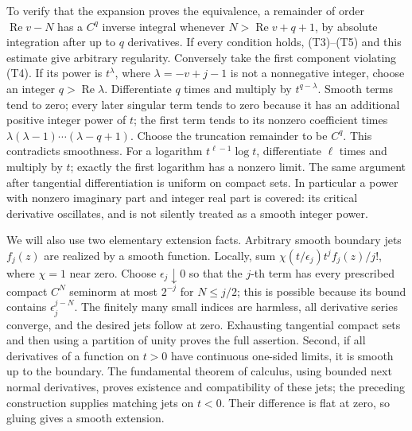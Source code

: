 \documentclass[
  11pt,
]{article}
\makeatletter
\let\ReaderOriginalAnchorStart\hyper@anchorstart
\let\ReaderOriginalAnchorEnd\hyper@anchorend
\let\ReaderPendingAliases\@empty
\def\ReaderArmAliases#1{\gdef\ReaderPendingAliases{#1}}
\def\hyper@anchorstart#1{\ReaderIfNativeAnchorTF{#1}{\ReaderPendingAliases\global\let\ReaderPendingAliases\@empty}{}\ReaderOriginalAnchorStart{#1}}
\makeatother
\begin{document}
To verify that the expansion proves the equivalence, a remainder of
order \(\operatorname{Re}v-N\) has a \(C^q\) inverse integral whenever
\(N>\operatorname{Re}v+q+1\), by absolute integration after up to \(q\)
derivatives. If every condition holds, (T3)--(T5) and this estimate give
arbitrary regularity. Conversely take the first component violating
(T4). If its power is \(t^\lambda\), where \(\lambda=-v+j-1\) is not a
nonnegative integer, choose an integer \(q>\operatorname{Re}\lambda\).
Differentiate \(q\) times and multiply by \(t^{q-\lambda}\). Smooth
terms tend to zero; every later singular term tends to zero because it
has an additional positive integer power of \(t\); the first term tends
to its nonzero coefficient times
\(\lambda(\lambda-1)\cdots(\lambda-q+1)\). Choose the truncation
remainder to be \(C^q\). This contradicts smoothness. For a logarithm
\(t^{\ell-1}\log t\), differentiate \(\ell\) times and multiply by
\(t\); exactly the first logarithm has a nonzero limit. The same
argument after tangential differentiation is uniform on compact sets. In
particular a power with nonzero imaginary part and integer real part is
covered: its critical derivative oscillates, and is not silently treated
as a smooth integer power.

We will also use two elementary extension facts. Arbitrary smooth
boundary jets \(f_j(z)\) are realized by a smooth function. Locally, sum
\(\chi(t/\epsilon_j)t^j f_j(z)/j!\), where \(\chi=1\) near zero. Choose
\(\epsilon_j\downarrow0\) so that the \(j\)-th term has every prescribed
compact \(C^N\) seminorm at most \(2^{-j}\) for \(N\leq j/2\); this is
possible because its bound contains \(\epsilon_j^{j-N}\). The finitely
many small indices are harmless, all derivative series converge, and the
desired jets follow at zero. Exhausting tangential compact sets and then
using a partition of unity proves the full assertion. Second, if all
derivatives of a function on \(t>0\) have continuous one-sided limits,
it is smooth up to the boundary. The fundamental theorem of calculus,
using bounded next normal derivatives, proves existence and
compatibility of these jets; the preceding construction supplies
matching jets on \(t<0\). Their difference is flat at zero, so gluing
gives a smooth extension.

\ReaderArmAliases{\ReaderOriginalAnchorStart{AN03-TR-002}\ReaderOriginalAnchorEnd\begingroup\expandafter\def\csname @currentHref\endcsname{AN03-TR-002}\label{AN03-TR-002}\endgroup\ReaderOriginalAnchorStart{an03-tr-002-supported-powers-and-the-spaces-of-complex-type}\ReaderOriginalAnchorEnd\begingroup\expandafter\def\csname @currentHref\endcsname{an03-tr-002-supported-powers-and-the-spaces-of-complex-type}\label{an03-tr-002-supported-powers-and-the-spaces-of-complex-type}\endgroup\ReaderOriginalAnchorStart{9-supported-powers-and-the-spaces-of-complex-type}\ReaderOriginalAnchorEnd\begingroup\expandafter\def\csname @currentHref\endcsname{9-supported-powers-and-the-spaces-of-complex-type}\label{9-supported-powers-and-the-spaces-of-complex-type}\endgroup\ReaderOriginalAnchorStart{supported-powers-and-the-spaces-of-complex-type}\ReaderOriginalAnchorEnd}
\end{document}
